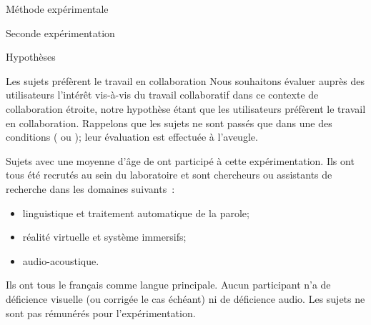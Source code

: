 \documentclass[myfrancais,ngerman,english,french]{mythesis}
\begin{document}
\begin{mychapter}{Méthode expérimentale}
\begin{mysection}{Seconde expérimentation}
\begin{mysubsection}{Hypothèses}
\begin{myparagraph}{ Les sujets préfèrent le travail en collaboration}
					Nous souhaitons évaluer auprès des utilisateurs l'intérêt vis-à-vis du travail collaboratif dans ce contexte de collaboration étroite, notre hypothèse étant que les utilisateurs préfèrent le travail en collaboration.
					Rappelons que les sujets ne sont passés que dans une des conditions ( ou ); leur évaluation est effectuée à l'aveugle.
				\end{myparagraph}
			\end{mysubsection}
			\begin{mysubsection}{Sujets}
				 avec une moyenne d'âge de  ont participé à cette expérimentation.
				Ils ont tous été recrutés au sein du laboratoire  et sont chercheurs ou assistants de recherche dans les domaines suivants~:
				\begin{itemize}
					\item linguistique et traitement automatique de la parole;
					\item réalité virtuelle et système immersifs;
					\item audio-acoustique.
				\end{itemize}
				Ils ont tous le français comme langue principale.
				Aucun participant n'a de déficience visuelle (ou corrigée le cas échéant) ni de déficience audio.
				Les sujets ne sont pas rémunérés pour l'expérimentation.


\end{mysubsection}
\end{mysection}
\end{mychapter}
\end{document}
